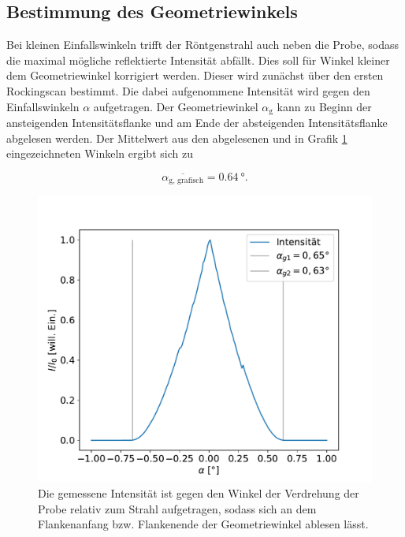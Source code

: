     \FloatBarrier


  \subsection{Bestimmung des Geometriewinkels}
    Bei kleinen Einfallswinkeln trifft der Röntgenstrahl auch neben die Probe, sodass die maximal mögliche reflektierte Intensität abfällt. Dies soll für Winkel kleiner dem Geometriewinkel korrigiert werden.
    Dieser wird zunächst über den ersten Rockingscan bestimmt. Die dabei aufgenommene Intensität wird gegen den Einfallswinkeln $\alpha$ aufgetragen. Der Geometriewinkel $\alpha_{\text{g}}$ kann zu Beginn der
    ansteigenden Intensitätsflanke und am Ende der absteigenden Intensitätsflanke abgelesen werden. Der Mittelwert aus den abgelesenen und in Grafik \ref{fig:rockingscan} eingezeichneten Winkeln ergibt sich zu

    \begin{equation*}
      \overline{\alpha_{\text{g, grafisch}}} = \SI{0.64}{\degree}.
    \end{equation*}

    \FloatBarrier
    \begin{figure}[h]
        \centering
        \includegraphics[width = \textwidth]{rockingscan_1.pdf}
        \caption{Die gemessene Intensität ist gegen den Winkel der Verdrehung der Probe relativ zum Strahl aufgetragen, sodass sich an dem Flankenanfang bzw. Flankenende der Geometriewinkel ablesen lässt.}
        \label{fig:rockingscan}
      \end{figure}
  
